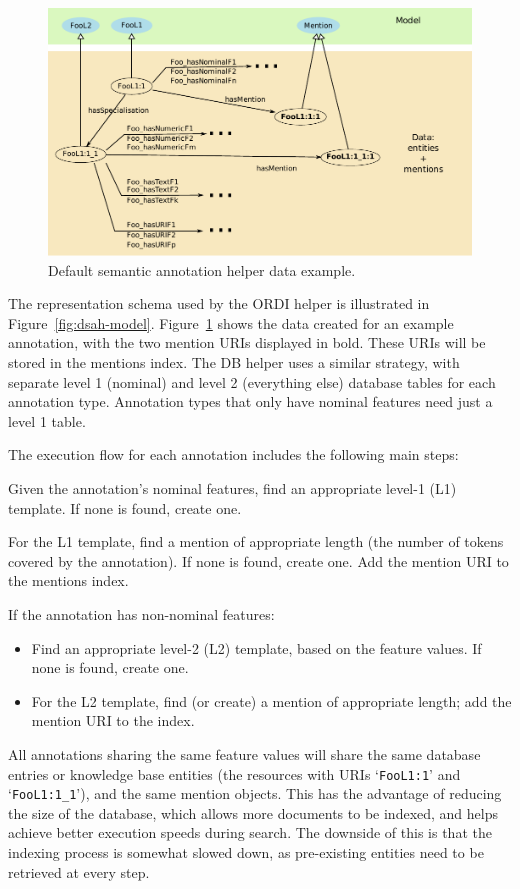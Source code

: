 \begin{figure}[htb]
\begin{center}
\includegraphics[scale=0.66]{img/dsah-data}
\caption{Default semantic annotation helper data example.}
\label{fig:dsah-data}
\end{center}
\end{figure}

The representation schema used by the ORDI helper is illustrated in
Figure~\ref{fig:dsah-model}.  Figure~\ref{fig:dsah-data} shows the data created
for an example annotation, with the two mention URIs displayed in bold. These
URIs will be stored in the mentions index.  The DB helper uses a similar
strategy, with separate level 1 (nominal) and level 2 (everything else)
database tables for each annotation type.  Annotation types that only have
nominal features need just a level 1 table.

The execution flow for each annotation includes the following main steps:
\bit
  \item Given the annotation's nominal features, find an appropriate level-1
  (L1) template. If none is found, create one.
  \item For the L1 template, find a mention of appropriate length (the number
  of tokens covered by the annotation). If none is found, create one. Add the
  mention URI to the mentions index.
  \item If the annotation has non-nominal features:
  \begin{itemize}
    \item Find an appropriate level-2 (L2) template, based on the feature
    values. If none is found, create one.
    \item For the L2 template, find (or create) a mention of appropriate length;
    add the mention URI to the index.
  \end{itemize}  
\eit

All annotations sharing the same feature values will share the same database
entries or knowledge base entities (the resources with URIs `\verb!FooL1:1!'
and `\verb!FooL1:1_1!'), and the same mention objects. This has the
advantage of reducing the size of the database, which allows more
documents to be indexed, and helps achieve better execution speeds during
search. The downside of this is that the indexing process is somewhat slowed
down, as pre-existing entities need to be retrieved at every step.
